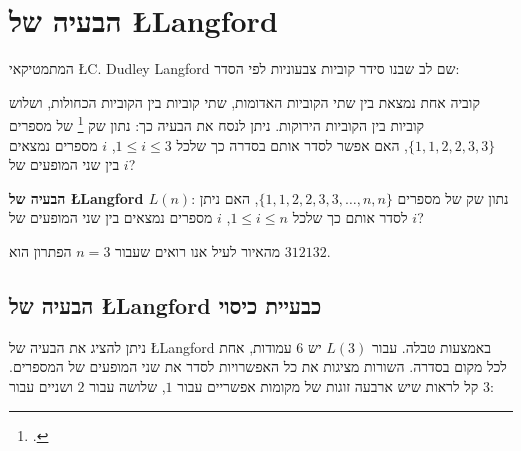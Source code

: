 


\chapter{הבעיה של 
\L{Langford}}
\label{c.langford}

המתמטיקאי
\L{C. Dudley Langford}
שם לב שבנו סידר קוביות צבעוניות לפי הסדר:
\begin{figure}
\begin{center}
\end{center}
\caption{}\label{}
\end{figure}

קוביה אחת נמצאת בין שתי הקוביות האדומות, שתי קוביות בין הקוביות הכחולות, ושלוש קוביות בין הקוביות הירוקות. ניתן לנסח את הבעיה כך:
נתון שק%
\footnote{.} של מספרים
$\{1,1,2,2,3,3\}$,
האם אפשר לסדר אותם בסדרה כך שלכל
$1\leq i \leq 3$,
$i$
מספרים נמצאים בין שני המופעים של
$i$?

\textbf{
הבעיה של
\L{Langford} $L(n)$}:
נתון שק של מספרים
$\{1,1,2,2,3,3,\ldots,n,n\}$,
האם ניתן לסדר אותם כך שלכל
$1\leq i \leq n$, $i$
מספרים נמצאים בין שני המופעים של
$i$?


מהאיור לעיל אנו רואים שעבור 
$n=3$
הפתרון הוא
$312132$.




\section{
הבעיה של
\L{Langford}
כבעיית כיסוי}

ניתן להציג את הבעיה של
\L{Langford}
באמצעות טבלה. עבור
$L(3)$
יש
$6$
עמודות, אחת לכל מקום בסדרה. השורות מציגות את כל האפשרויות לסדר את  שני המופעים של המספרים. קל לראות שיש ארבעה זוגות של מקומות אפשריים עבור
$1$,
שלושה עבור
$2$
ושניים עבור
$3$:

